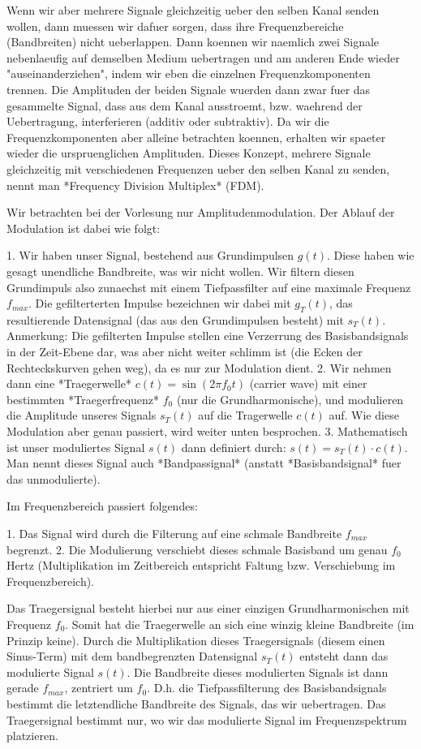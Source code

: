 Wenn wir aber mehrere Signale gleichzeitig ueber den selben Kanal senden wollen, dann muessen wir dafuer sorgen, dass ihre Frequenzbereiche (Bandbreiten) nicht ueberlappen. Dann koennen wir naemlich zwei Signale nebenlaeufig auf demselben Medium uebertragen und am anderen Ende wieder "auseinanderziehen", indem wir eben die einzelnen Frequenzkomponenten trennen. Die Amplituden der beiden Signale wuerden dann zwar fuer das gesammelte Signal, dass aus dem Kanal ausstroemt, bzw. waehrend der Uebertragung, interferieren (additiv oder subtraktiv). Da wir die Frequenzkomponenten aber alleine betrachten koennen, erhalten wir spaeter wieder die urspruenglichen Amplituden. Dieses Konzept, mehrere Signale gleichzeitig mit verschiedenen Frequenzen ueber den selben Kanal zu senden, nennt man *Frequency Division Multiplex* (FDM).

Wir betrachten bei der Vorlesung nur Amplitudenmodulation. Der Ablauf der
Modulation ist dabei wie folgt:

1. Wir haben unser Signal, bestehend aus Grundimpulsen $g(t)$. Diese haben wie
  gesagt unendliche Bandbreite, was wir nicht wollen. Wir filtern diesen
  Grundimpuls also zunaechst mit einem Tiefpassfilter auf eine maximale Frequenz
  $f_{max}$. Die gefilterterten Impulse bezeichnen wir dabei mit $g_T(t)$, das
  resultierende Datensignal (das aus den Grundimpulsen besteht) mit $s_T(t)$. Anmerkung: Die gefilterten Impulse
  stellen eine Verzerrung des Basisbandsignals in der Zeit-Ebene dar, was aber
  nicht weiter schlimm ist (die Ecken der Rechteckskurven gehen weg), da es nur zur Modulation dient.
2. Wir nehmen dann eine *Traegerwelle* $c(t) = \sin(2\pi f_0 t)$ (carrier wave) mit
   einer bestimmten *Traegerfrequenz* $f_0$ (nur die Grundharmonische), und
   modulieren die Amplitude unseres Signals $s_T(t)$ auf die Tragerwelle $c(t)$
   auf. Wie diese Modulation aber genau passiert, wird weiter  unten besprochen.
3. Mathematisch ist unser moduliertes Signal $s(t)$ dann definiert durch: $s(t)
   = s_T(t) \cdot c(t)$. Man nennt dieses Signal auch *Bandpassignal* (anstatt
   *Basisbandsignal* fuer das unmodulierte).

Im Frequenzbereich passiert folgendes:

1. Das Signal wird durch die Filterung auf eine schmale Bandbreite $f_{max}$ begrenzt.
2. Die Modulierung verschiebt dieses schmale Basisband um genau $f_0$ Hertz (Multiplikation im Zeitbereich entspricht Faltung bzw. Verschiebung im Frequenzbereich).

Das Traegersignal besteht hierbei nur aus einer einzigen Grundharmonischen mit Frequenz $f_0$. Somit hat die Traegerwelle an sich eine winzig kleine Bandbreite (im Prinzip keine). Durch die Multiplikation dieses Traegersignals (diesem einen Sinus-Term) mit dem bandbegrenzten Datensignal $s_T(t)$ entsteht dann das modulierte Signal $s(t)$. Die Bandbreite dieses modulierten Signals ist dann gerade $f_{max}$, zentriert um $f_0$. D.h. die Tiefpassfilterung des Basisbandsignals bestimmt die letztendliche Bandbreite des Signals, das wir uebertragen. Das Traegersignal bestimmt nur, wo wir das modulierte Signal im Frequenzspektrum platzieren.

